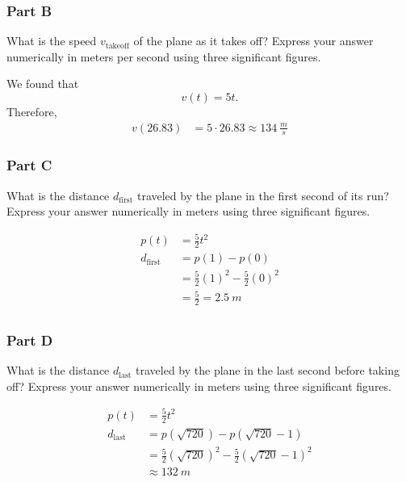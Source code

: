 \subsubsection{Part B}
What is the speed $v_{\mathrm{takeoff}}$ of the plane as it takes off? Express your answer numerically in meters per second using three significant figures.

\begin{solution}
	We found that
	\[
		v(t) = 5t
		.\]
	Therefore,
	\begin{align*}
		v(26.83) &= 5 \cdot 26.83 \approx \boxed{\SI{134}{\frac{m}{s}}}
	\end{align*}
\end{solution}

\subsubsection{Part C}
What is the distance $d_{\mathrm{first}}$ traveled by the plane in the first second of its run? Express your answer numerically in meters using three significant figures.

\begin{solution}
	\begin{align*}
		p(t) &= \frac{5}{2}t^2 \\
		d_{\mathrm{first}} &= p(1) - p(0) \\
		&= \frac{5}{2}\left( 1 \right)^2 - \frac{5}{2}\left( 0 \right)^2 \\
		&= \frac{5}{2} = \boxed{\SI{2.5}{m}} \\
	\end{align*}
\end{solution}

\subsubsection{Part D}
What is the distance $d_{\mathrm{last}}$ traveled by the plane in the last second before taking off? Express your answer numerically in meters  using three significant figures.

\begin{solution}
	\begin{align*}
		p(t) &= \frac{5}{2}t^2 \\
		d_{\mathrm{last}} &= p(\sqrt{720}) - p(\sqrt{720}-1) \\
		&= \frac{5}{2} \left( \sqrt{720} \right)^2 - \frac{5}{2} \left( \sqrt{720} -1 \right)^2 \\
		&\approx \boxed{\SI{132}{m}}
	\end{align*}
\end{solution}

